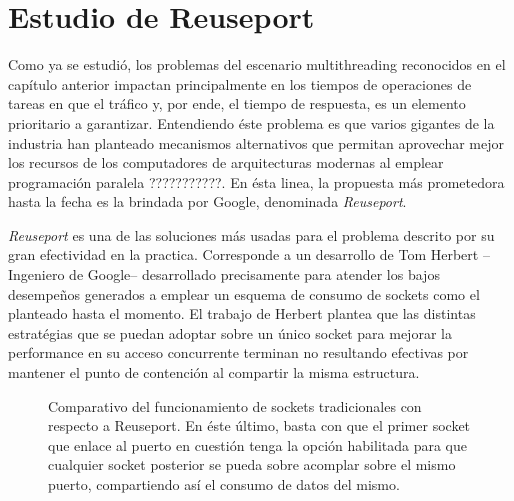 \chapter{Estudio de Reuseport}

Como ya se estudió, los problemas del escenario multithreading reconocidos en el capítulo anterior impactan principalmente en los tiempos de operaciones de tareas en que el tráfico y, por ende, el tiempo de respuesta, es un elemento prioritario a garantizar. Entendiendo éste problema es que varios gigantes de la industria han planteado mecanismos alternativos que permitan aprovechar mejor los recursos de los computadores de arquitecturas modernas al emplear programación paralela ???????????. En ésta linea, la propuesta más prometedora hasta la fecha es la brindada por Google, denominada \emph{Reuseport}.

\emph{Reuseport} \cite{slides:googleReuseport} es una de las soluciones más usadas para el problema descrito por su gran efectividad en la practica. Corresponde a un desarrollo de Tom Herbert --Ingeniero de Google-- desarrollado precisamente para atender los bajos desempeños generados a emplear un esquema de consumo de sockets como el planteado hasta el momento. El trabajo de Herbert plantea que las distintas estratégias que se puedan adoptar sobre un único socket para mejorar la performance en su acceso concurrente terminan no resultando efectivas por mantener el punto de contención al compartir la misma estructura.

\begin{figure}[h!]
	\centering
	\hspace*{\fill}
	\hfill
	\caption{Comparativo del funcionamiento de sockets tradicionales con respecto a Reuseport. En éste último, basta con que el primer socket que enlace al puerto en cuestión tenga la opción habilitada para que cualquier socket posterior se pueda sobre acomplar sobre el mismo puerto, compartiendo así el consumo de datos del mismo.}
	\label{fig:socketHandshake}
	\hspace*{\fill}
\end{figure}


